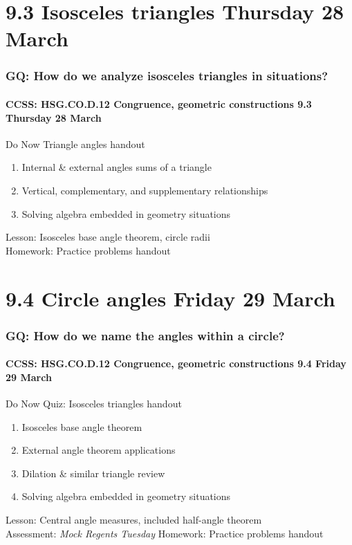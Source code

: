 \documentclass{beamer}
\begin{document}
\section{9.3 Isosceles triangles Thursday 28 March}
  \frame
  {
    \frametitle{GQ: How do we analyze isosceles triangles in situations?}
    \framesubtitle{CCSS: HSG.CO.D.12 Congruence, geometric constructions \hfill \alert{9.3 Thursday 28 March}}

      \begin{block}{Do Now Triangle angles handout}
        \begin{enumerate}
          \item Internal \& external angles sums of a triangle
          \item Vertical, complementary, and supplementary relationships
          \item Solving algebra embedded in geometry situations
        \end{enumerate}
      \end{block}
    Lesson: Isosceles base angle theorem, circle radii\\
    Homework: Practice problems handout
  }

\section{9.4 Circle angles Friday 29 March}
  \frame
  {
    \frametitle{GQ: How do we name the angles within a circle?}
    \framesubtitle{CCSS: HSG.CO.D.12 Congruence, geometric constructions \hfill \alert{9.4 Friday 29 March}}

      \begin{block}{Do Now Quiz: Isosceles triangles handout}
        \begin{enumerate}
          \item Isosceles base angle theorem
          \item External angle theorem applications
          \item Dilation \& similar triangle review
          \item Solving algebra embedded in geometry situations
        \end{enumerate}
      \end{block}
    Lesson: Central angle measures, included half-angle theorem\\
    Assessment: \emph{Mock Regents Tuesday}
    Homework: Practice problems handout
  }
\end{document}
